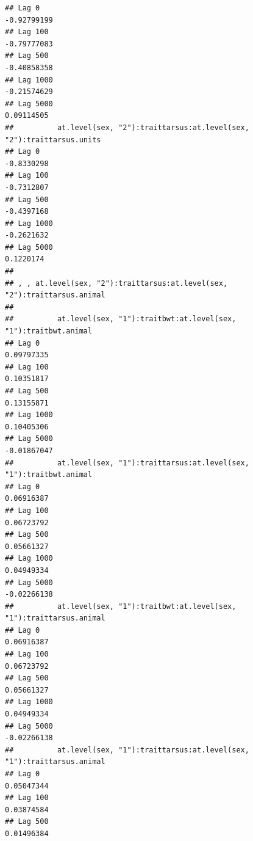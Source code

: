 \documentclass[
  12pt,
]{book}
\begin{document}
\begin{verbatim}
## Lag 0                                                         -0.92799199
## Lag 100                                                       -0.79777083
## Lag 500                                                       -0.40858358
## Lag 1000                                                      -0.21574629
## Lag 5000                                                       0.09114505
##          at.level(sex, "2"):traittarsus:at.level(sex, "2"):traittarsus.units
## Lag 0                                                             -0.8330298
## Lag 100                                                           -0.7312807
## Lag 500                                                           -0.4397168
## Lag 1000                                                          -0.2621632
## Lag 5000                                                           0.1220174
## 
## , , at.level(sex, "2"):traittarsus:at.level(sex, "2"):traittarsus.animal
## 
##          at.level(sex, "1"):traitbwt:at.level(sex, "1"):traitbwt.animal
## Lag 0                                                        0.09797335
## Lag 100                                                      0.10351817
## Lag 500                                                      0.13155871
## Lag 1000                                                     0.10405306
## Lag 5000                                                    -0.01867047
##          at.level(sex, "1"):traittarsus:at.level(sex, "1"):traitbwt.animal
## Lag 0                                                           0.06916387
## Lag 100                                                         0.06723792
## Lag 500                                                         0.05661327
## Lag 1000                                                        0.04949334
## Lag 5000                                                       -0.02266138
##          at.level(sex, "1"):traitbwt:at.level(sex, "1"):traittarsus.animal
## Lag 0                                                           0.06916387
## Lag 100                                                         0.06723792
## Lag 500                                                         0.05661327
## Lag 1000                                                        0.04949334
## Lag 5000                                                       -0.02266138
##          at.level(sex, "1"):traittarsus:at.level(sex, "1"):traittarsus.animal
## Lag 0                                                              0.05047344
## Lag 100                                                            0.03874584
## Lag 500                                                            0.01496384

\end{verbatim}
\end{document}

